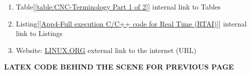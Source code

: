 \begin{tcolorbox}
\begin{enumerate}
	\item Table[\ref{table:CNC-Terminology Part 1 of 2}] internal link to Tables
	
	\item Listing[\ref{App4-Full execution C/C++ code for Real Time (RTAI)}] internal link to Listings 
	
	\item Website: \href{https://www.linux.org/}{LINUX.ORG} external link to the internet (URL)
	
\end{enumerate}


\end{tcolorbox}

\clearpage
\pagebreak
	
\textbf{LATEX CODE BEHIND THE SCENE FOR PREVIOUS PAGE}
\vspace*{1\baselineskip}


